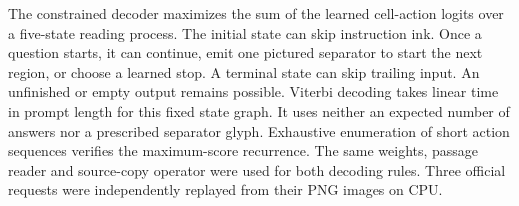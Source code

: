 The constrained decoder maximizes the sum of the learned cell-action logits over a five-state reading process. The initial state can skip instruction ink. Once a question starts, it can continue, emit one pictured separator to start the next region, or choose a learned stop. A terminal state can skip trailing input. An unfinished or empty output remains possible. Viterbi decoding takes linear time in prompt length for this fixed state graph. It uses neither an expected number of answers nor a prescribed separator glyph. Exhaustive enumeration of short action sequences verifies the maximum-score recurrence. The same weights, passage reader and source-copy operator were used for both decoding rules. Three official requests were independently replayed from their PNG images on CPU.
